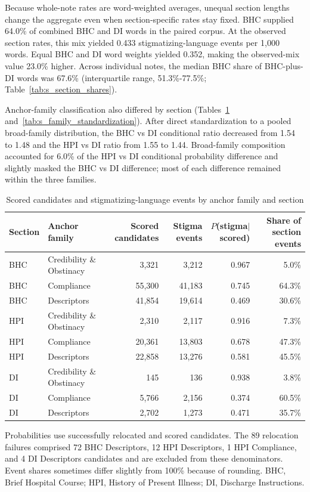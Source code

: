 \documentclass[unnumsec,webpdf,contemporary,large]{oup-authoring-template}
\begin{document}
Because whole-note rates are word-weighted averages, unequal section lengths change the aggregate even when section-specific rates stay fixed. BHC supplied 64.0\% of combined BHC and DI words in the paired corpus. At the observed section rates, this mix yielded 0.433 stigmatizing-language events per 1,000 words. Equal BHC and DI word weights yielded 0.352, making the observed-mix value 23.0\% higher. Across individual notes, the median BHC share of BHC-plus-DI words was 67.6\% (interquartile range, 51.3\%-77.5\%; Table~\ref{tab:s_section_shares}).

Anchor-family classification also differed by section (Tables~\ref{tab:s_families} and~\ref{tab:s_family_standardization}). After direct standardization to a pooled broad-family distribution, the BHC vs DI conditional ratio decreased from 1.54 to 1.48 and the HPI vs DI ratio from 1.55 to 1.44. Broad-family composition accounted for 6.0\% of the HPI vs DI conditional probability difference and slightly masked the BHC vs DI difference; most of each difference remained within the three families.

\begin{table}[H]
\caption{Scored candidates and stigmatizing-language events by anchor family and section}
\label{tab:s_families}
\centering
\small
\begin{tabular}{llrrrr}
\toprule
Section & Anchor family & Scored candidates & Stigma events & $P$(stigma$\mid$scored) & Share of section events \\
\midrule
BHC & Credibility \& Obstinacy & 3,321 & 3,212 & 0.967 & 5.0\% \\
BHC & Compliance & 55,300 & 41,183 & 0.745 & 64.3\% \\
BHC & Descriptors & 41,854 & 19,614 & 0.469 & 30.6\% \\
HPI & Credibility \& Obstinacy & 2,310 & 2,117 & 0.916 & 7.3\% \\
HPI & Compliance & 20,361 & 13,803 & 0.678 & 47.3\% \\
HPI & Descriptors & 22,858 & 13,276 & 0.581 & 45.5\% \\
DI & Credibility \& Obstinacy & 145 & 136 & 0.938 & 3.8\% \\
DI & Compliance & 5,766 & 2,156 & 0.374 & 60.5\% \\
DI & Descriptors & 2,702 & 1,273 & 0.471 & 35.7\% \\
\bottomrule
\end{tabular}
\begin{tablenotes}
\item Probabilities use successfully relocated and scored candidates. The 89 relocation failures comprised 72 BHC Descriptors, 12 HPI Descriptors, 1 HPI Compliance, and 4 DI Descriptors candidates and are excluded from these denominators. Event shares sometimes differ slightly from 100\% because of rounding. BHC, Brief Hospital Course; HPI, History of Present Illness; DI, Discharge Instructions.
\end{tablenotes}
\end{table}
\end{document}

